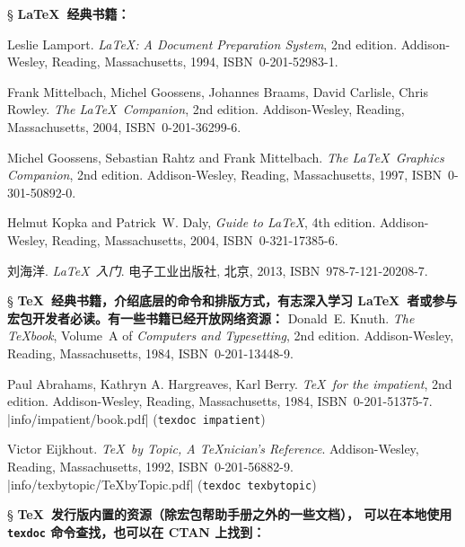 \begin{thebibliography}{20}

\item[\S] {\bfseries \LaTeX\ 经典书籍：}

 Leslie Lamport. 
  \newblock \emph{\LaTeX: A Document Preparation System}, 2nd edition.
  \newblock Addison-Wesley, Reading, Massachusetts, 1994, ISBN~0-201-52983-1.

 Frank Mittelbach, Michel Goossens, Johannes Braams, David Carlisle, Chris Rowley. 
  \newblock \emph{The \LaTeX\ Companion}, 2nd edition.
  \newblock Addison-Wesley, Reading, Massachusetts, 2004, ISBN~0-201-36299-6.

 Michel Goossens, Sebastian Rahtz and Frank Mittelbach. 
  \newblock \emph{The \LaTeX\ Graphics Companion}, 2nd edition.
  \newblock Addison-Wesley, Reading, Massachusetts, 1997, ISBN~0-301-50892-0.

 Helmut Kopka and Patrick~W. Daly,
  \newblock \emph{Guide to \LaTeX}, 4th edition.
  \newblock Addison-Wesley, Reading, Massachusetts, 2004, ISBN~0-321-17385-6.

 刘海洋.
  \newblock \emph{\LaTeX\ 入门}. 
  \newblock 电子工业出版社, 北京, 2013, ISBN~978-7-121-20208-7.

\item[\S] {\bfseries \TeX\ 经典书籍，介绍底层的命令和排版方式，有志深入学习 \LaTeX\ 者或参与宏包开发者必读。有一些书籍已经开放网络资源：}
 Donald~E. Knuth. 
  \newblock \emph{The \TeX book}, Volume~A of \textit{Computers and Typesetting}, 2nd edition.
  \newblock Addison-Wesley, Reading, Massachusetts, 1984, ISBN~0-201-13448-9.

 Paul Abrahams, Kathryn A. Hargreaves, Karl Berry.
  \newblock \emph{\TeX\ for the impatient}, 2nd edition.
  \newblock Addison-Wesley, Reading, Massachusetts, 1984, ISBN~0-201-51375-7. \\
  \CTAN|info/impatient/book.pdf| (\texttt{texdoc impatient})

 Victor Eijkhout. 
  \newblock \emph{\TeX\ by Topic, A \TeX nician's Reference}.
  \newblock Addison-Wesley, Reading, Massachusetts, 1992, ISBN~0-201-56882-9. \\
  \CTAN|info/texbytopic/TeXbyTopic.pdf| (\texttt{texdoc texbytopic})

\item[\S] {\bfseries \TeX\ 发行版内置的资源（除宏包帮助手册之外的一些文档），
  可以在本地使用 \texttt{texdoc} 命令查找，也可以在 CTAN 上找到：}


\end{thebibliography}
